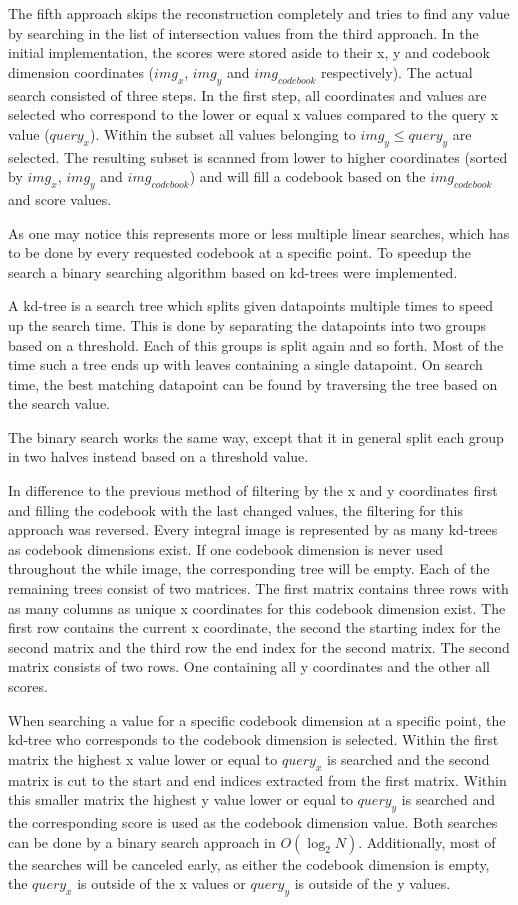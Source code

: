 The fifth approach skips the reconstruction completely and tries to find any value by searching in the list of intersection values from the third approach. In the initial implementation, the scores were stored aside to their x, y and codebook dimension coordinates ($img_x$, $img_y$ and $img_{codebook}$ respectively). The actual search consisted of three steps. In the first step, all coordinates and values are selected who correspond to the lower or equal x values compared to the query x value ($query_x$). Within the subset all values belonging to $img_y \le query_y$ are selected. The resulting subset is scanned from lower to higher coordinates (sorted by $img_x$, $img_y$ and $img_{codebook}$) and will fill a codebook based on the $img_{codebook}$ and score values.

As one may notice this represents more or less multiple linear searches, which has to be done by every requested codebook at a specific point. To speedup the search a binary searching algorithm based on kd-trees were implemented.

A kd-tree is a search tree which splits given datapoints multiple times to speed up the search time. This is done by separating the datapoints into two groups based on a threshold. Each of this groups is split again and so forth. Most of the time such a tree ends up with leaves containing a single datapoint. On search time, the best matching datapoint can be found by traversing the tree based on the search value.

The binary search works the same way, except that it in general split each group in two halves instead based on a threshold value.

In difference to the previous method of filtering by the x and y coordinates first and filling the codebook with the last changed values, the filtering for this approach was reversed. Every integral image is represented by as many kd-trees as codebook dimensions exist. If one codebook dimension is never used throughout the while image, the corresponding tree will be empty. Each of the remaining trees consist of two matrices. The first matrix contains three rows with as many columns as unique x coordinates for this codebook dimension exist. The first row contains the current x coordinate, the second the starting index for the second matrix and the third row the end index for the second matrix. The second matrix consists of two rows. One containing all y coordinates and the other all scores.

When searching a value for a specific codebook dimension at a specific point, the kd-tree who corresponds to the codebook dimension is selected. Within the first matrix the highest x value lower or equal to $query_x$ is searched and the second matrix is cut to the start and end indices extracted from the first matrix. Within this smaller matrix the highest y value lower or equal to $query_y$ is searched and the corresponding score is used as the codebook dimension value. Both searches can be done by a binary search approach in $O(\log_2 N)$. Additionally, most of the searches will be canceled early, as either the codebook dimension is empty, the $query_x$ is outside of the x values or $query_y$ is outside of the y values.


